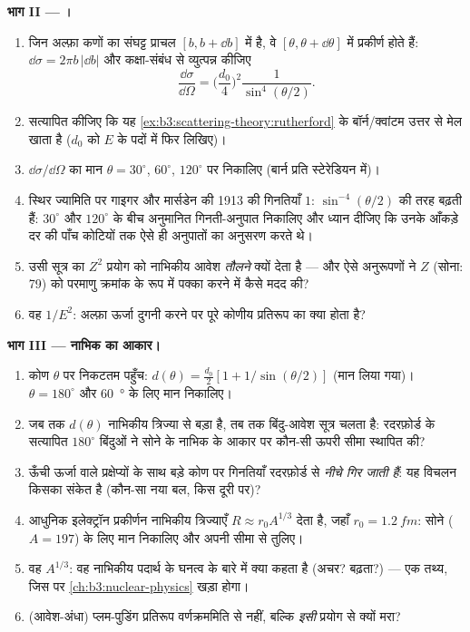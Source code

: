 \begin{problem}
\medskip\noindent\textbf{भाग II --- ।}
\begin{enumerate}[resume]
  \item जिन अल्फ़ा कणों का संघट्ट प्राचल $[b, b + \dd b]$ में है, वे
        $[\theta, \theta + \dd\theta]$ में प्रकीर्ण होते हैं: $\dd\sigma =
        2\pi b\,|\dd b|$ और कक्षा-संबंध से व्युत्पन्न कीजिए
        \[
        \frac{\dd\sigma}{\dd\Omega} =
        \Big(\frac{d_0}{4}\Big)^2\frac{1}{\sin^4(\theta/2)} .
        \]
  \item सत्यापित कीजिए कि यह
        \cref{ex:b3:scattering-theory:rutherford} के बॉर्न/क्वांटम
        उत्तर से मेल खाता है ($d_0$ को $E$ के पदों में फिर लिखिए)।
  \item $\dd\sigma/\dd\Omega$ का मान $\theta = 30^\circ$,
        $60^\circ$, $120^\circ$ पर निकालिए (बार्न प्रति स्टेरेडियन में)।
  \item स्थिर ज्यामिति पर गाइगर और मार्सडेन की 1913 की गिनतियाँ
        $1{:}\,\sin^{-4}(\theta/2)$ की तरह बढ़ती हैं: $30^\circ$ और
        $120^\circ$ के बीच अनुमानित गिनती-अनुपात निकालिए और
        ध्यान दीजिए कि
        उनके आँकड़े दर की पाँच कोटियों तक ऐसे ही अनुपातों का
        अनुसरण करते थे।
  \item उसी सूत्र का $Z^2$ प्रयोग को नाभिकीय आवेश \emph{तौलने}
        क्यों देता है --- और ऐसे अनुरूपणों ने $Z$ (सोना: 79) को
        परमाणु क्रमांक के रूप में पक्का करने में कैसे मदद की?
  \item वह $1/E^2$: अल्फ़ा ऊर्जा दुगनी करने पर पूरे कोणीय प्रतिरूप
        का क्या होता है?
\end{enumerate}

\medskip\noindent\textbf{भाग III --- नाभिक का आकार।}
\begin{enumerate}[resume]
  \item कोण $\theta$ पर निकटतम पहुँच: $d(\theta) =
        \tfrac{d_0}2[1 + 1/\sin(\theta/2)]$ (मान लिया गया)।
        $\theta = 180^\circ$ और \qty{60}{\degree} के लिए मान निकालिए।
  \item जब तक $d(\theta)$ नाभिकीय त्रिज्या से बड़ा है, तब तक
        बिंदु-आवेश सूत्र चलता है: रदरफ़ोर्ड के सत्यापित $180^\circ$
        बिंदुओं ने सोने के नाभिक के आकार पर कौन-सी ऊपरी सीमा
        स्थापित की?
  \item ऊँची ऊर्जा वाले प्रक्षेप्यों के साथ बड़े कोण पर गिनतियाँ
        रदरफ़ोर्ड से \emph{नीचे गिर जाती हैं}: यह विचलन किसका संकेत
        है (कौन-सा नया बल, किस दूरी पर)?
  \item आधुनिक इलेक्ट्रॉन प्रकीर्णन नाभिकीय त्रिज्याएँ $R
        \approx r_0A^{1/3}$ देता है, जहाँ $r_0 = \qty{1.2}{fm}$:
        सोने ($A = 197$) के लिए मान निकालिए और अपनी सीमा से तुलिए।
  \item वह $A^{1/3}$: वह नाभिकीय पदार्थ के घनत्व के बारे में क्या
        कहता है (अचर? बढ़ता?) --- एक तथ्य, जिस पर
        \cref{ch:b3:nuclear-physics} खड़ा होगा।
  \item (आवेश-अंधा) प्लम-पुडिंग प्रतिरूप वर्णक्रममिति से नहीं,
        बल्कि \emph{इसी} प्रयोग से क्यों मरा?
\end{enumerate}


\end{problem}
